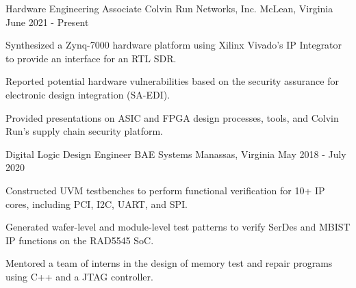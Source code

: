 \begin{cventries}
\cventry
{Hardware Engineering Associate} %
{Colvin Run Networks, Inc.} %
{McLean, Virginia} %
{June 2021 - Present} %
{
\begin{cvitems}
\item{Synthesized a Zynq-7000 hardware platform using Xilinx Vivado's IP Integrator to provide an interface for an RTL SDR.}
\item{Reported potential hardware vulnerabilities based on the security assurance for electronic design integration (SA-EDI).}
\item{Provided presentations on ASIC and FPGA design processes, tools, and Colvin Run's supply chain security platform.}
\end{cvitems}
}


\cventry
{Digital Logic Design Engineer} %
{BAE Systems} %
{Manassas, Virginia} %
{May 2018 - July 2020} %
{ %
\begin{cvitems}
\item {Constructed UVM testbenches to perform functional verification for 10+ IP cores, including PCI, I2C, UART, and SPI.}
\item {Generated wafer-level and module-level test patterns to verify SerDes and MBIST IP functions on the RAD5545 SoC.}
\item {Mentored a team of interns in the design of memory test and repair programs using C++ and a JTAG controller.}
\end{cvitems}
}


\end{cventries}
